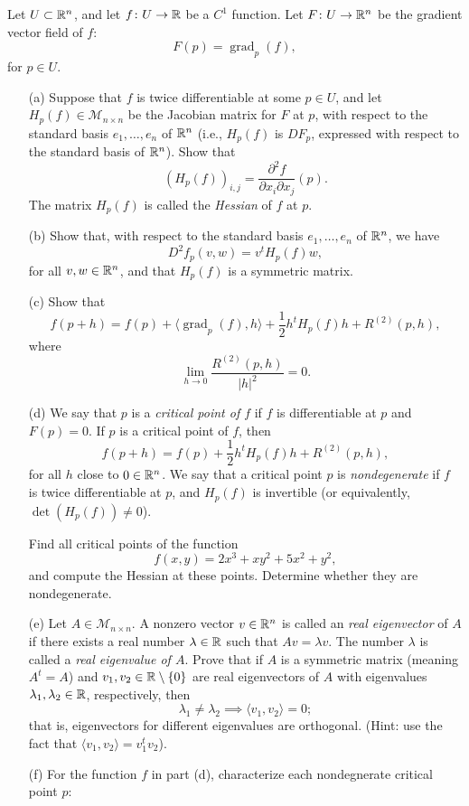 \documentclass[a4paper, 12pt]{article}
\begin{document}
\begin{problem} 
Let $U\subset \mathbb{R}^n$, and let $f\colon U\to \mathbb{R}$ be a  $C^1$ function. Let  $F\colon U\to \mathbb{R}^n$ be the gradient vector field of $f$:
\[F(p) = \operatorname{grad}_p(f),
\]
for $p\in U$.
\begin{enumerate}
    \item[(a)]  Suppose that $f$ is twice differentiable at some $p\in U$, and  let  $H_p(f)\in {\mathcal M}_{n\times n}$ be the Jacobian matrix for $F$ at $p$, with respect to the standard basis $e_1,\ldots, e_n$ of $\mathbb{R}^n$ (i.e., $H_p(f)$ is $DF_p$, expressed with respect to the standard basis of $\mathbb{R}^n$).   Show that
        \[(H_p(f))_{i,j} = \frac{\partial^2 f}{\partial x_i \partial x_j}(p).
        \]
        The matrix $H_p(f)$ is called the {\em Hessian} of $f$ at $p$.
    \item[(b)] Show that, with respect to the standard basis $e_1, \ldots, e_n$ of $\mathbb{R}^n$, we have
        \[D^2f_p(v,w) = v^t H_p(f)  w,\]
        for all $v,w\in\mathbb{R}^n$, and that $H_p(f)$ is a symmetric matrix.
    \item[(c)] Show that
        \[
            f(p+h) = f(p) + \langle \operatorname{grad}_p(f), h \rangle  + \frac{1}{2} h^t H_p( f) h + R^{(2)}(p,h),
        \]
        where
        \[\lim_{h\to 0} \frac{R^{(2)}(p,h)}{|h|^2} = 0.
        \]
    \item[(d)] We say that $p$ is a {\em critical point of $f$} if $f$ is differentiable at $p$ and $F(p)=0$.  If $p$ is a  critical point of $f$, then
        \begin{equation}\label{e=criticalHess}
            f(p+h) = f(p) + \frac{1}{2}h^t H_p (f)  h + R^{(2)}(p,h),
        \end{equation}
        for all $h$ close to $0\in \mathbb{R}^n$.
        We say that a critical point $p$ is {\em nondegenerate} if $f$ is twice differentiable at $p$, and  $H_p(f)$ is invertible (or equivalently, $\det(H_p(f))\neq 0$).

        Find all critical points of the function \[f(x,y) =  2x^3 + xy^2 + 5x^2 + y^2,\] and compute the Hessian at these points.  Determine whether they are nondegenerate.

    \item[(e)] Let $A\in {\mathcal M}_{n\times n}$.  A nonzero vector $v\in \mathbb{R}^n$ is called an {\em real eigenvector} of $A$ if there exists a real number $\lambda\in\mathbb{R}$ such that $Av = \lambda v$.  The number $\lambda$ is called a {\em real eigenvalue of $A$}. 	Prove that if $A$ is a symmetric matrix (meaning $A^t = A$) and  $v_1, v_2\in\mathbb{R}\setminus \{0\}$ are real eigenvectors of $A$ with eigenvalues $\lambda_1, \lambda_2\in \mathbb{R}$, respectively, then
        \[\lambda_1\neq \lambda_2 \implies \langle v_1,v_2\rangle = 0;\]
        that is, eigenvectors for different eigenvalues are orthogonal.  (Hint: use the fact that $ \langle v_1,v_2\rangle = v_1^t v_2$).
    \item[(f)] For the function $f$ in part (d), characterize each nondegnerate critical point $p$:


\end{enumerate}
\end{problem}
\end{document}
